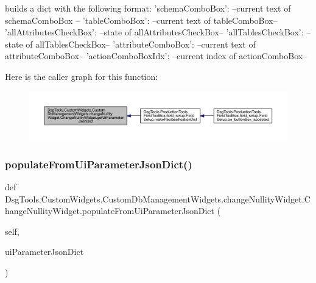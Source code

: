 \begin{DoxyVerb}builds a dict with the following format:
{
    'schemaComboBox': --current text of schemaComboBox --
    'tableComboBox': --current text of tableComboBox--
    'allAttributesCheckBox': --state of allAttributesCheckBox--
    'allTablesCheckBox': --state of allTablesCheckBox--
    'attributeComboBox': --current text of attributeComboBox--
    'actionComboBoxIdx': --current index of actionComboBox--
}
\end{DoxyVerb}
 Here is the caller graph for this function\+:
\nopagebreak
\begin{figure}[H]
\begin{center}
\leavevmode
\includegraphics[width=350pt]{class_dsg_tools_1_1_custom_widgets_1_1_custom_db_management_widgets_1_1change_nullity_widget_1_1_change_nullity_widget_a9caacd56123b1b1023fddf37612dbc99_icgraph}
\end{center}
\end{figure}
\mbox{\label{class_dsg_tools_1_1_custom_widgets_1_1_custom_db_management_widgets_1_1change_nullity_widget_1_1_change_nullity_widget_a8ec7f953cd76042117d056f7d52c03a5}} 
\subsubsection{\texorpdfstring{populate\+From\+Ui\+Parameter\+Json\+Dict()}{populateFromUiParameterJsonDict()}}
{\footnotesize\ttfamily def Dsg\+Tools.\+Custom\+Widgets.\+Custom\+Db\+Management\+Widgets.\+change\+Nullity\+Widget.\+Change\+Nullity\+Widget.\+populate\+From\+Ui\+Parameter\+Json\+Dict (\begin{DoxyParamCaption}\item[{}]{self,  }\item[{}]{ui\+Parameter\+Json\+Dict }\end{DoxyParamCaption})}

